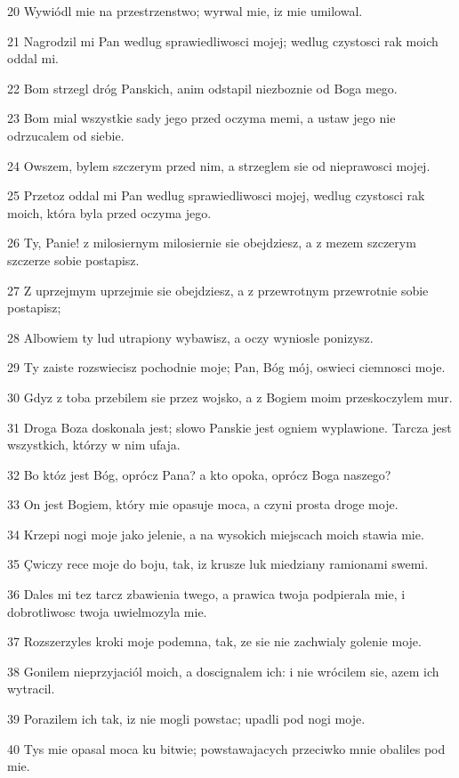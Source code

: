 \par 20 Wywiódl mie na przestrzenstwo; wyrwal mie, iz mie umilowal.
\par 21 Nagrodzil mi Pan wedlug sprawiedliwosci mojej; wedlug czystosci rak moich oddal mi.
\par 22 Bom strzegl dróg Panskich, anim odstapil niezboznie od Boga mego.
\par 23 Bom mial wszystkie sady jego przed oczyma memi, a ustaw jego nie odrzucalem od siebie.
\par 24 Owszem, bylem szczerym przed nim, a strzeglem sie od nieprawosci mojej.
\par 25 Przetoz oddal mi Pan wedlug sprawiedliwosci mojej, wedlug czystosci rak moich, która byla przed oczyma jego.
\par 26 Ty, Panie! z milosiernym milosiernie sie obejdziesz, a z mezem szczerym szczerze sobie postapisz.
\par 27 Z uprzejmym uprzejmie sie obejdziesz, a z przewrotnym przewrotnie sobie postapisz;
\par 28 Albowiem ty lud utrapiony wybawisz, a oczy wyniosle ponizysz.
\par 29 Ty zaiste rozswiecisz pochodnie moje; Pan, Bóg mój, oswieci ciemnosci moje.
\par 30 Gdyz z toba przebilem sie przez wojsko, a z Bogiem moim przeskoczylem mur.
\par 31 Droga Boza doskonala jest; slowo Panskie jest ogniem wyplawione. Tarcza jest wszystkich, którzy w nim ufaja.
\par 32 Bo któz jest Bóg, oprócz Pana? a kto opoka, oprócz Boga naszego?
\par 33 On jest Bogiem, który mie opasuje moca, a czyni prosta droge moje.
\par 34 Krzepi nogi moje jako jelenie, a na wysokich miejscach moich stawia mie.
\par 35 Çwiczy rece moje do boju, tak, iz krusze luk miedziany ramionami swemi.
\par 36 Dales mi tez tarcz zbawienia twego, a prawica twoja podpierala mie, i dobrotliwosc twoja uwielmozyla mie.
\par 37 Rozszerzyles kroki moje podemna, tak, ze sie nie zachwialy golenie moje.
\par 38 Gonilem nieprzyjaciól moich, a doscignalem ich: i nie wrócilem sie, azem ich wytracil.
\par 39 Porazilem ich tak, iz nie mogli powstac; upadli pod nogi moje.
\par 40 Tys mie opasal moca ku bitwie; powstawajacych przeciwko mnie obaliles pod mie.
